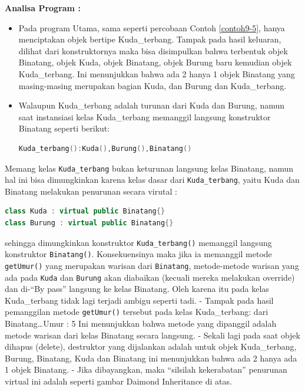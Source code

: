 \textbf{Analisa Program :}

\begin{itemize}
\item
  Pada program Utama, sama seperti percobaan Contoh \ref{contoh9-5}, hanya menciptakan
  objek bertipe Kuda\_terbang. Tampak pada hasil keluaran, dilihat dari
  konstruktornya maka bisa disimpulkan bahwa terbentuk objek Binatang,
  objek Kuda, objek Binatang, objek Burung baru kemudian objek
  Kuda\_terbang. Ini menunjukkan bahwa ada 2 hanya 1 objek Binatang yang
  masing-masing merupakan bagian Kuda, dan Burung dan Kuda\_terbang.
\item
  Walaupun Kuda\_terbang adalah turunan dari Kuda dan Burung, namun saat
  instansiasi kelas Kuda\_terbang memanggil langsung konstruktor
  Binatang seperti berikut:

\begin{lstlisting}[language=c++, numbers=none]
Kuda_terbang():Kuda(),Burung(),Binatang()
\end{lstlisting}
\end{itemize}

Memang kelas \texttt{Kuda\_terbang} bukan keturunan langsung kelas
Binatang, namun hal ini bisa dimungkinkan karena kelas dasar dari
\texttt{Kuda\_terbang}, yaitu Kuda dan Binatang melakukan penurunan
secara virutal :

\begin{lstlisting}[language=c++, numbers=none]
class Kuda : virtual public Binatang{}
class Burung : virtual public Binatang{}
\end{lstlisting}

sehingga dimungkinkan konstruktor \texttt{Kuda\_terbang()} memanggil
langsung konstruktor \texttt{Binatang()}. Konsekuensinya maka jika ia
memanggil metode \texttt{getUmur()} yang merupakan warisan dari
\texttt{Binatang}, metode-metode warisan yang ada pada \texttt{Kuda} dan
\texttt{Burung} akan diabaikan (kecuali mereka melakukan override) dan
di-``By pass'' langsung ke kelas Binatang. Oleh karena itu pada kelas
Kuda\_terbang tidak lagi terjadi ambigu seperti tadi. - Tampak pada
hasil pemanggilan metode \texttt{getUmur()} tersebut pada kelas
Kuda\_terbang: dari Binatang\ldots{}Umur : 5 Ini menunjukkan bahwa
metode yang dipanggil adalah metode warisan dari kelas Binatang secara
langsung. - Sekali lagi pada saat objek dihapus (delete), destruktor
yang dijalankan adalah untuk objek Kuda\_terbang, Burung, Binatang, Kuda
dan Binatang ini menunjukkan bahwa ada 2 hanya ada 1 objek Binatang. -
Jika dibayangkan, maka ``silsilah kekerabatan'' penurunan virtual ini
adalah seperti gambar Daimond Inheritance di atas.

